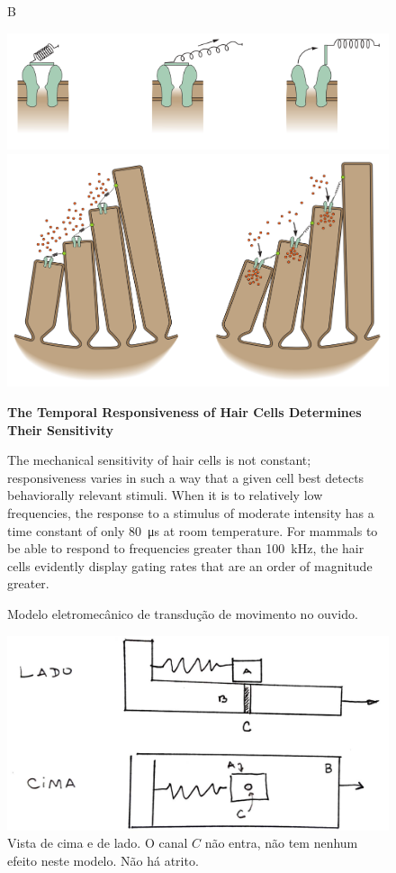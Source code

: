 \documentclass[]{IMTexam}
\begin{document}
\begin{figure}[H]
{\begin{minipage}{0.95\linewidth}
\begin{multi}
				B

				\includegraphics[width=1\linewidth]{screenshot005}

				\includegraphics[width=1\linewidth]{screenshot006}
			\end{multi}

			\medskip

			\textbf{The Temporal Responsiveness of Hair Cells Determines Their Sensitivity}

			The mechanical sensitivity of hair cells is not constant; responsiveness varies in such a way that a given cell best detects behaviorally relevant stimuli. When it is to relatively low frequencies, the response to a stimulus of moderate intensity has a time constant of only \SI{80}{\micro\second} at room temperature. For mammals to be able to respond to frequencies greater than \SI{100}{\kilo\hertz}, the hair cells evidently display gating rates that are an order of magnitude greater.
		\end{minipage}
	}


	\caption{Modelo eletromecânico de transdução de movimento no ouvido.}
	\label{fig:fig3}
\end{figure}

\clearpage

\begin{figure}[H]
	\centering
	\includegraphics[width=0.5\linewidth]{screenshot007}
	\caption{Vista de cima e de lado. O canal $ C $ não entra, não tem nenhum efeito neste modelo. Não há atrito.}
	\label{fig:fig4}
\end{figure}
\end{document}
